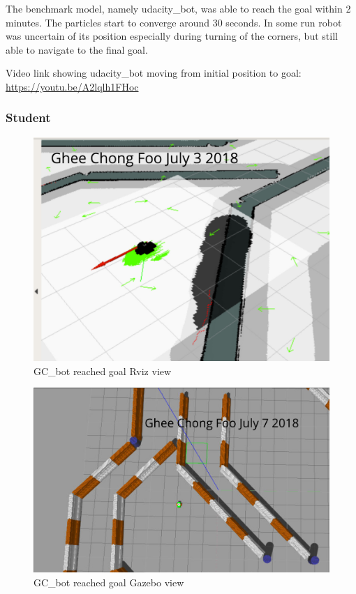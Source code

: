 \documentclass[10pt,journal,compsoc]{IEEEtran}
\begin{document}
The benchmark model, namely udacity\_bot, was able to reach the goal within 2 minutes. The particles start to converge around 30 seconds.  In some run robot was uncertain of its position especially during turning of the corners, but still able to navigate to the final goal.

Video link showing udacity\_bot moving from initial position to goal:
\url{https://youtu.be/A2lqlh1FHoc}


\subsubsection{Student}

\begin{figure}[thpb]
      \centering
      \includegraphics[width=\linewidth]{GC_bot_reach_goal_rviz}
      \caption{GC\_bot reached goal Rviz view}
      \label{fig:GC_bot_reach_goal_rviz}
\end{figure}

\begin{figure}[thpb]
      \centering
      \includegraphics[width=\linewidth]{GC_bot_reach_goal_gazebo}
      \caption{GC\_bot reached goal Gazebo view}
      \label{fig:GC_bot_reach_goal_gazebo}
\end{figure}
\end{document}
